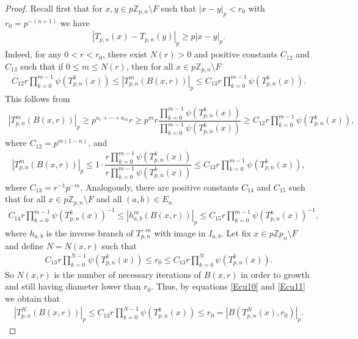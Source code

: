 \documentclass[10pt,a4paper]{amsart}
\newcommand{\Z}{\mathbb{Z}}
\begin{document}
\begin{proof}
     Recall first that for $x,y\in  p\Z_{p,n}\setminus F$ such that $|x-y|_{p}<r_{0}$ with  $r_{0}=p^{-(n+1)}$ we have 
     \begin{align*}
         |T_{p,n}(x)-T_{p,n}(y)|_{p}\geq p|x-y|_{p}.
     \end{align*}Indeed, for any $0<r<r_{0}$, there exist $N(r)>0$ and positive constants $C_{12}$ and $C_{13}$ such that if $0\leq m \leq N(r)$, then for all $x\in  p\Z_{p,n}\setminus F$
     \begin{align}\label{Ecu10}
         C_{12}r\prod^{m-1}_{k=0}\psi(T_{p,n}^{k}(x))\leq  |T_{p,n}^{m}(B(x,r))|_{p}\leq C_{13}r\prod^{m-1}_{k=0}\psi(T^{k}_{p,n}(x)).
     \end{align} This follows from
     \begin{align*}
         |T_{p,n}^{m}(B(x,r))|_{p}\geq p^{a_{1}+\cdots +a_{m}}r\geq p^{m}r\dfrac{\prod^{m-1}_{k=0}\psi(T_{p,n}^{k}(x))}{\prod^{m-1}_{k=0}\psi(T_{p,n}^{k}(x))}\geq C_{12}r\prod^{m-1}_{k=0}\psi(T_{p,n}^{k}(x)),
     \end{align*}where $C_{12}=p^{m(1-n)}$, and
     \begin{align*}
         |T_{p,n}^{m}(B(x,r))|_{p}\leq 1\cdot \dfrac{r\prod^{m-1}_{k=0}\psi(T_{p,n}^{k}(x))}{r\prod^{m-1}_{k=0}\psi(T_{p,n}^{k}(x))}\leq C_{13}r\prod^{m-1}_{k=0}\psi(T_{p,n}^{k}(x)),
     \end{align*} where $C_{13}=r^{-1}p^{-m}$.  Analogously, there are positive constants $C_{14}$ and $C_{15}$ such that for all $x\in p\Z_{p,n}\setminus F$ and all $(a,b)\in E_{n}$ 
\begin{align}\label{Ecu11}
         C_{14}r\prod^{m-1}_{k=0}\psi(T_{p,n}^{k}(x))^{-1}\leq  |h_{a,b}^{m}(B(x,r))|_{p}\leq C_{15}r\prod^{m-1}_{k=0}\psi(T^{k}_{p,n}(x))^{-1},
     \end{align} where $h_{a,b}$  is the inverse branch of  $T^{-m}_{p,n}$ with image in $I_{a,b}$. Let fix $x\in p\Z p_{n}\setminus F$ and define $N=N(x,r)$ such that 
     \begin{align*}
         C_{13}r\prod^{N-1}_{k=0}\psi(T^{k}_{p,n}(x))\leq r_{0}\leq C_{13}r\prod^{N}_{k=0}\psi(T^{k}_{p,n}(x)).
     \end{align*} So $N(x,r)$ is the number of necessary iterations of $B(x,r)$ in order to growth and still having diameter lower than $r_{0}$. Thus, by equations \eqref{Ecu10} and \eqref{Ecu11} we obtain that
\begin{align*}
    \left|T_{p,n}^{N}(B(x,r))\right|_{p}\leq C_{13}r\prod^{N-1}_{k=0}\psi(T^{k}_{p,n}(x))\leq r_{0}=\left|B(T^{N}_{p,n}(x),r_{0})\right|_{p}.

\end{align*}
\end{proof}
\end{document}
